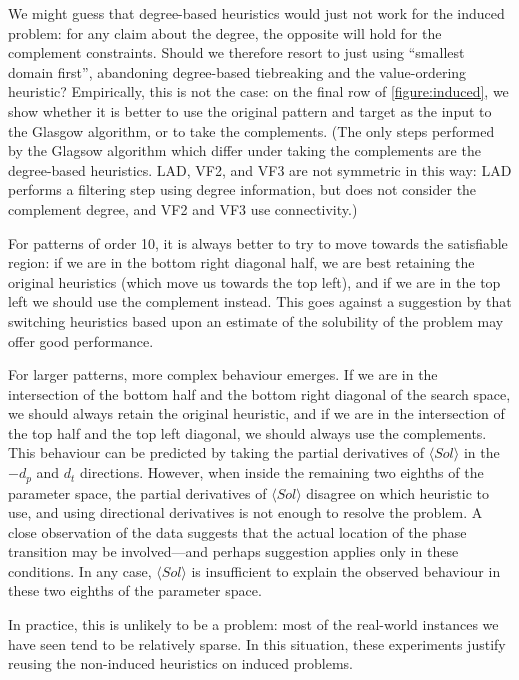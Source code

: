 \documentclass[twoside,11pt]{article}
\begin{document}
We might guess that degree-based heuristics would just not work for the induced problem: for any
claim about the degree, the opposite will hold for the complement constraints. Should we therefore
resort to just using ``smallest domain first'', abandoning degree-based tiebreaking and the
value-ordering heuristic? Empirically, this is not the case: on the final row of
\cref{figure:induced}, we show whether it is better to use the original pattern and target as the
input to the Glasgow algorithm, or to take the complements.  (The only steps performed by the
Glagsow algorithm which differ under taking the complements are the degree-based heuristics.  LAD,
VF2, and VF3 are not symmetric in this way: LAD performs a filtering step using degree information,
but does not consider the complement degree, and VF2 and VF3 use connectivity.)

For patterns of order 10, it is always better to try to move towards the satisfiable region: if we
are in the bottom right diagonal half, we are best retaining the original heuristics (which move us
towards the top left), and if we are in the top left we should use the complement instead. This
goes against a suggestion by  that switching heuristics based upon an estimate of
the solubility of the problem may offer good performance.

For larger patterns, more complex behaviour emerges. If we are in the intersection of the bottom half
and the bottom right diagonal of the search space, we should always retain the original heuristic,
and if we are in the intersection of the top half and the top left diagonal, we should always use
the complements. This behaviour can be predicted by taking the partial derivatives of $\langle Sol
\rangle$ in the $-d_p$ and $d_t$ directions.  However, when inside the remaining two eighths of the
parameter space, the partial derivatives of $\langle Sol \rangle$ disagree on which heuristic to
use, and using directional derivatives is not enough to resolve the problem. A close observation of
the data suggests that the actual location of the phase transition may be involved---and perhaps
 suggestion applies only in these conditions. In any case, $\langle Sol
\rangle$ is insufficient to explain the observed behaviour in these two eighths of the parameter space.

In practice, this is unlikely to be a problem: most of the real-world instances we have seen tend to
be relatively sparse. In this situation, these experiments justify reusing the non-induced
heuristics on induced problems.
\end{document}
